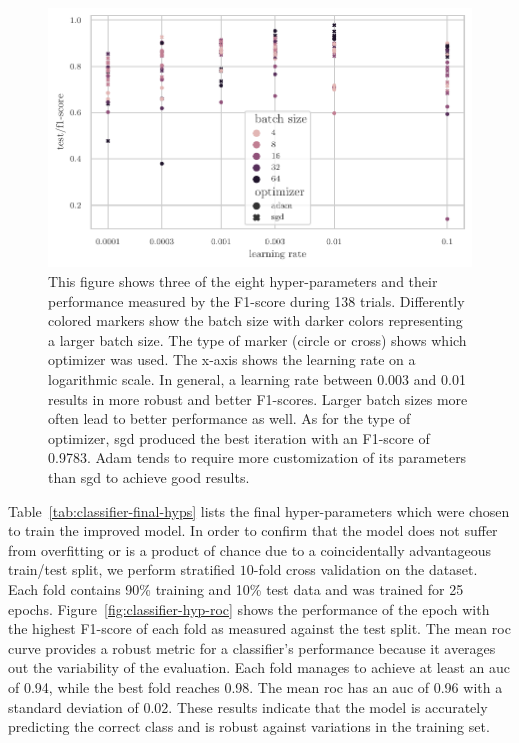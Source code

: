 \documentclass[draft,final]{vutinfth} %
\begin{document}
\begin{figure}
  \centering
  \includegraphics{graphics/classifier-hyp-metrics.pdf}
  \caption[Classifier hyper-parameter optimization results.]{This
    figure shows three of the eight hyper-parameters and their
    performance measured by the F1-score during 138
    trials. Differently colored markers show the batch size with
    darker colors representing a larger batch size. The type of marker
    (circle or cross) shows which optimizer was used. The x-axis shows
    the learning rate on a logarithmic scale. In general, a learning
    rate between 0.003 and 0.01 results in more robust and better
    F1-scores. Larger batch sizes more often lead to better
    performance as well. As for the type of optimizer, \gls{sgd}
    produced the best iteration with an F1-score of 0.9783. Adam tends
    to require more customization of its parameters than \gls{sgd} to
    achieve good results.}
  \label{fig:classifier-hyp-results}
\end{figure}

Table~\ref{tab:classifier-final-hyps} lists the final hyper-parameters
which were chosen to train the improved model. In order to confirm
that the model does not suffer from overfitting or is a product of
chance due to a coincidentally advantageous train/test split, we
perform stratified $10$-fold cross validation on the dataset. Each
fold contains 90\% training and 10\% test data and was trained for 25
epochs. Figure~\ref{fig:classifier-hyp-roc} shows the performance of
the epoch with the highest F1-score of each fold as measured against
the test split. The mean \gls{roc} curve provides a robust metric for
a classifier's performance because it averages out the variability of
the evaluation. Each fold manages to achieve at least an \gls{auc} of
0.94, while the best fold reaches 0.98. The mean \gls{roc} has an
\gls{auc} of 0.96 with a standard deviation of 0.02. These results
indicate that the model is accurately predicting the correct class and
is robust against variations in the training set.
\end{document}

